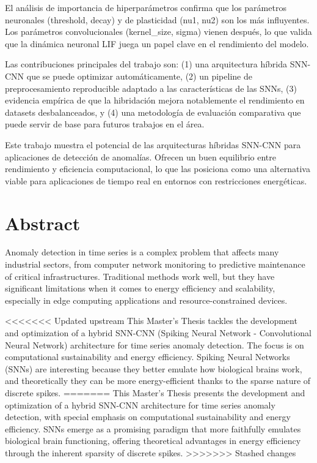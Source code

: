 El análisis de importancia de hiperparámetros confirma que los parámetros neuronales (threshold, decay) y de plasticidad (nu1, nu2) son los más influyentes. Los parámetros convolucionales (kernel\_size, sigma) vienen después, lo que valida que la dinámica neuronal LIF juega un papel clave en el rendimiento del modelo.

Las contribuciones principales del trabajo son: (1) una arquitectura híbrida SNN-CNN que se puede optimizar automáticamente, (2) un pipeline de preprocesamiento reproducible adaptado a las características de las SNNs, (3) evidencia empírica de que la hibridación mejora notablemente el rendimiento en datasets desbalanceados, y (4) una metodología de evaluación comparativa que puede servir de base para futuros trabajos en el área.

Este trabajo muestra el potencial de las arquitecturas híbridas SNN-CNN para aplicaciones de detección de anomalías. Ofrecen un buen equilibrio entre rendimiento y eficiencia computacional, lo que las posiciona como una alternativa viable para aplicaciones de tiempo real en entornos con restricciones energéticas.

\chapter*{Abstract}
\label{chap:resumen}

Anomaly detection in time series is a complex problem that affects many industrial sectors, from computer network monitoring to predictive maintenance of critical infrastructures. Traditional methods work well, but they have significant limitations when it comes to energy efficiency and scalability, especially in edge computing applications and resource-constrained devices.

<<<<<<< Updated upstream
This Master's Thesis tackles the development and optimization of a hybrid SNN-CNN (Spiking Neural Network - Convolutional Neural Network) architecture for time series anomaly detection. The focus is on computational sustainability and energy efficiency. Spiking Neural Networks (SNNs) are interesting because they better emulate how biological brains work, and theoretically they can be more energy-efficient thanks to the sparse nature of discrete spikes.
=======
This Master's Thesis presents the development and optimization of a hybrid SNN-CNN architecture for time series anomaly detection, with special emphasis on computational sustainability and energy efficiency. SNNs emerge as a promising paradigm that more faithfully emulates biological brain functioning, offering theoretical advantages in energy efficiency through the inherent sparsity of discrete spikes.
>>>>>>> Stashed changes

